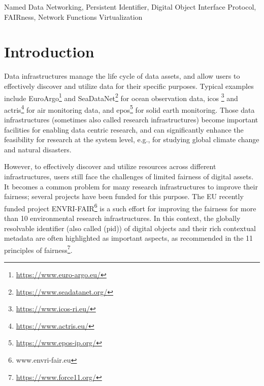 \documentclass[conference]{IEEEtran}
\begin{document}
\begin{abstract}
\end{abstract}

\begin{IEEEkeywords}
Named Data Networking, Persistent Identifier, Digital Object Interface Protocol, FAIRness, Network Functions Virtualization
\end{IEEEkeywords}

\section{Introduction}
Data infrastructures manage the life cycle of data assets, and allow users to effectively discover and utilize data for their specific purposes. Typical examples include EuroArgo\footnote{\url{https://www.euro-argo.eu/}} and SeaDataNet\footnote{\url{https://www.seadatanet.org/}} for ocean observation data, \gls{icos} \footnote{\url{https://www.icos-ri.eu/}} and \gls{actris}\footnote{\url{https://www.actris.eu/}} for air monitoring data, and \gls{epos}\footnote{\url{https://www.epos-ip.org/}} for solid earth monitoring. Those data infrastructures (sometimes also called research infrastructures) become important facilities for enabling data centric research, and can significantly enhance the feasibility for research at the system level, e.g., for studying global climate change and natural disasters.

However, to effectively discover and utilize resources across different infrastructures, users still face the challenges of limited \gls{fairness} of digital assets. It becomes a common problem for many research infrastructures to improve their \gls{fairness}; several projects have been funded for this purpose. The EU recently funded project ENVRI-FAIR\footnote{www.envri-fair.eu} is a such effort for improving the \gls{fairness} for more than 10 environmental research infrastructures. In this context, the globally resolvable identifier (also called (\gls{pid})) of digital objects and their rich contextual metadata are often highlighted as important aspects, as recommended in the 11 principles of \gls{fairness}\footnote{\url{https://www.force11.org/}}.
\end{document}
